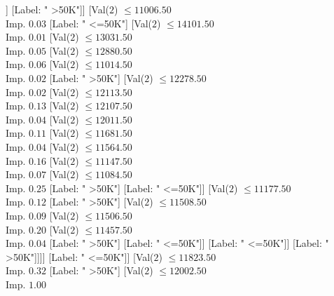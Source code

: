 \documentclass[margin=10pt]{standalone}
\begin{document}
\begin{forest}
														[Val($2$) $ \leq 10705.50$ \\ Imp. $0.92$
															[Label: " >50K"]
															[Label: " <=50K"]]
														[Label: " >50K"]]
													[Val($2$) $ \leq 11006.50$ \\ Imp. $0.03$
														[Label: " <=50K"]
														[Val($2$) $ \leq 14101.50$ \\ Imp. $0.01$
															[Val($2$) $ \leq 13031.50$ \\ Imp. $0.05$
																[Val($2$) $ \leq 12880.50$ \\ Imp. $0.06$
																	[Val($2$) $ \leq 11014.50$ \\ Imp. $0.02$
																		[Label: " >50K"]
																		[Val($2$) $ \leq 12278.50$ \\ Imp. $0.02$
																			[Val($2$) $ \leq 12113.50$ \\ Imp. $0.13$
																				[Val($2$) $ \leq 12107.50$ \\ Imp. $0.04$
																					[Val($2$) $ \leq 12011.50$ \\ Imp. $0.11$
																						[Val($2$) $ \leq 11681.50$ \\ Imp. $0.04$
																							[Val($2$) $ \leq 11564.50$ \\ Imp. $0.16$
																								[Val($2$) $ \leq 11147.50$ \\ Imp. $0.07$
																									[Val($2$) $ \leq 11084.50$ \\ Imp. $0.25$
																										[Label: " >50K"]
																										[Label: " <=50K"]]
																									[Val($2$) $ \leq 11177.50$ \\ Imp. $0.12$
																										[Label: " >50K"]
																										[Val($2$) $ \leq 11508.50$ \\ Imp. $0.09$
																											[Val($2$) $ \leq 11506.50$ \\ Imp. $0.20$
																												[Val($2$) $ \leq 11457.50$ \\ Imp. $0.04$
																													[Label: " >50K"]
																													[Label: " <=50K"]]
																												[Label: " <=50K"]]
																											[Label: " >50K"]]]]
																								[Label: " <=50K"]]
																							[Val($2$) $ \leq 11823.50$ \\ Imp. $0.32$
																								[Label: " >50K"]
																								[Val($2$) $ \leq 12002.50$ \\ Imp. $1.00$

\end{forest}
\end{document}
